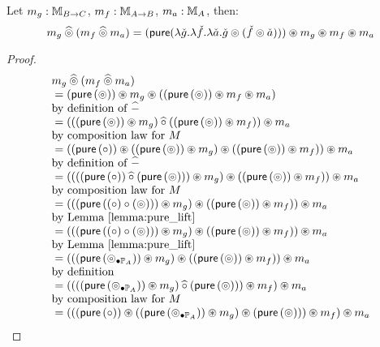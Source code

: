 \begin{lemma}\label{lemma:pappl_comp_appl}
Let $m_g:\mstream{B\rightarrow C}$, $m_f:\mstream{A\rightarrow B}$, $m_a:\mstream{A}$, then:
$$
m_g \alift{\pappl} (m_f \alift{\pappl} m_a)
 = (\apure (\lambda \pstr{g}. \lambda \pstr{f}. \lambda \pstr{a}. \pstr{g} \pappl (\pstr{f}\pappl \pstr{a}))) \appl m_g \appl m_f \appl m_a
$$
\end{lemma}
\begin{proof}
$$
\begin{array}{ll}
m_g \alift{\pappl} (m_f \alift{\pappl} m_a) \\
{}= (\apure\, (\pappl)) \appl m_g \appl ((\apure\, (\pappl)) \appl m_f \appl m_a) \\
 \mbox{by definition of }\alift{-}\\
{}= (  ((\apure\, (\pappl)) \appl m_g) \alift{\comp} ((\apure\, (\pappl)) \appl m_f)  ) \appl m_a \\
 \mbox{by composition law for }M \\
{}= (  (\apure\, (\comp)) \appl  ((\apure\, (\pappl)) \appl m_g) \appl ((\apure\, (\pappl)) \appl m_f)  ) \appl m_a \\
 \mbox{by definition of }\alift{-}\\
{}= (  ( ((\apure\, (\comp)) \alift{\comp}  (\apure\, (\pappl))) \appl m_g ) \appl ((\apure\, (\pappl)) \appl m_f)  ) \appl m_a \\
 \mbox{by composition law for }M \\
{}= (  ( (\apure\, ((\comp) \comp (\pappl)) ) \appl m_g ) \appl ((\apure\, (\pappl)) \appl m_f)  ) \appl m_a\\
 \mbox{by Lemma \ref{lemma:pure_lift}}\\
{}= (  ( (\apure\, ((\comp) \comp (\pappl)) ) \appl m_g ) \appl ((\apure\, (\pappl)) \appl m_f)  ) \appl m_a\\
 \mbox{by Lemma \ref{lemma:pure_lift}}\\
{}= (  ( (\apure\, (\clift{\pappl}{\pstream{A}}) ) \appl m_g ) \appl ((\apure\, (\pappl)) \appl m_f)  ) \appl m_a\\
 \mbox{by definition}\\
{}= (  (( (\apure\, (\clift{\pappl}{\pstream{A}}) ) \appl m_g ) \alift{\comp} (\apure\, (\pappl))) \appl m_f  ) \appl m_a\\
 \mbox{by composition law for }M \\
{}= (  ( (\apure\, (\comp)) \appl ( (\apure\, (\clift{\pappl}{\pstream{A}}) ) \appl m_g ) \appl (\apure\, (\pappl)) ) \appl m_f  ) \appl m_a\\

\end{array}$$
\end{proof}
